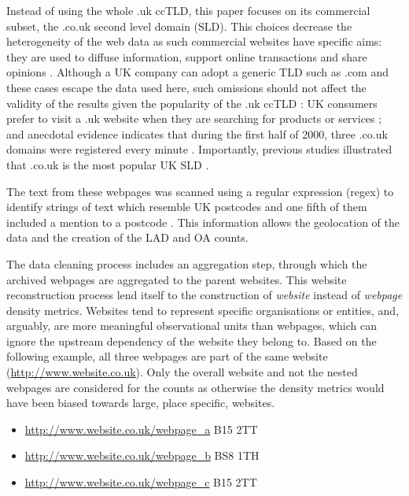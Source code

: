 \documentclass[
  authoryear,
  preprint,
  3p]{elsarticle}
\begin{document}
Instead of using the whole .uk ccTLD, this paper focuses on its
commercial subset, the .co.uk second level domain (SLD). This choices
decrease the heterogeneity of the web data as such commercial websites
have specific aims: they are used to diffuse information, support online
transactions and share opinions
\citep{THELWALL2000441, blazquez2018big}. Although a UK company can
adopt a generic TLD such as .com and these cases escape the data used
here, such omissions should not affect the validity of the results given
the popularity of the .uk ccTLD \citep{tranosuk}: UK consumers prefer to
visit a .uk website when they are searching for products or services
\citep{hope}; and anecdotal evidence indicates that during the first
half of 2000, three .co.uk domains were registered every minute
\citep{oecd_coms}. Importantly, previous studies illustrated that .co.uk
is the most popular UK SLD \citep{tranosuk}.

The text from these webpages was scanned using a regular expression
(regex) to identify strings of text which resemble UK postcodes and one
fifth of them included a mention to a postcode \citep{BL2013geo}. This
information allows the geolocation of the data and the creation of the
LAD and OA counts.

The data cleaning process includes an aggregation step, through which
the archived webpages are aggregated to the parent websites. This
website reconstruction process lend itself to the construction of
\emph{website} instead of \emph{webpage} density metrics. Websites tend
to represent specific organisations or entities, and, arguably, are more
meaningful observational units than webpages, which can ignore the
upstream dependency of the website they belong to. Based on the
following example, all three webpages are part of the same website
(\url{http://www.website.co.uk}). Only the overall website and not the
nested webpages are considered for the counts as otherwise the density
metrics would have been biased towards large, place specific, websites.

\begin{itemize}
\item
  \url{http://www.website.co.uk/webpage_a} B15 2TT
\item
  \url{http://www.website.co.uk/webpage_b} BS8 1TH
\item
  \url{http://www.website.co.uk/webpage_c} B15 2TT
\end{itemize}
\end{document}
